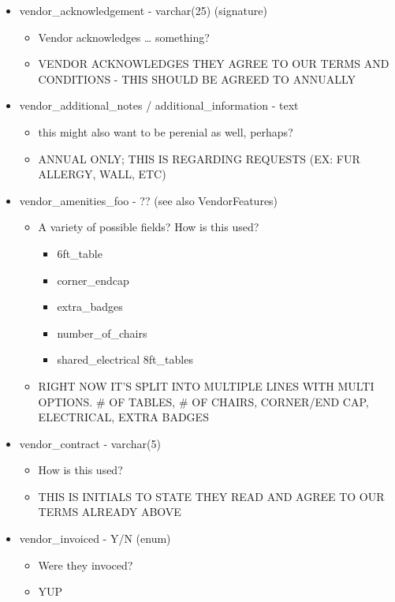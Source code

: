 \documentclass[captions=tablesignature]{scrartcl}
\begin{document}
\begin{itemize}
\item vendor\_acknowledgement - varchar(25) (signature)
\label{sec-2-2-8}
\begin{itemize}
\item Vendor acknowledges \ldots{} something?
\item VENDOR ACKNOWLEDGES THEY AGREE TO OUR TERMS AND CONDITIONS -
THIS SHOULD BE AGREED TO ANNUALLY
\end{itemize}

\item vendor\_additional\_notes / additional\_information - text
\label{sec-2-2-9}
\begin{itemize}
\item this might also want to be perenial as well, perhaps?
\item ANNUAL ONLY; THIS IS REGARDING REQUESTS (EX:  FUR ALLERGY, WALL,
ETC)
\end{itemize}

\item vendor\_amenities\_foo - ?? (see also VendorFeatures)
\label{sec-2-2-10}
\begin{itemize}
\item A variety of possible fields?  How is this  used?
\begin{itemize}
\item 6ft\_table
\item corner\_endcap
\item extra\_badges
\item number\_of\_chairs
\item shared\_electrical 8ft\_tables
\end{itemize}
\item RIGHT NOW IT'S SPLIT INTO MULTIPLE LINES WITH MULTI OPTIONS.  \#
OF TABLES, \# OF CHAIRS, CORNER/END CAP, ELECTRICAL, EXTRA
BADGES
\end{itemize}

\item vendor\_contract - varchar(5)
\label{sec-2-2-11}
\begin{itemize}
\item How is this used?
\item THIS IS INITIALS TO STATE THEY READ AND AGREE TO OUR TERMS ALREADY ABOVE
\end{itemize}

\item vendor\_invoiced - Y/N (enum)
\label{sec-2-2-12}
\begin{itemize}
\item Were they invoced?
\item YUP
\end{itemize}


\end{itemize}
\end{document}
